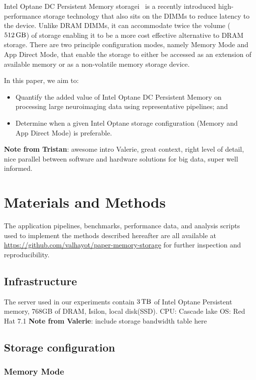 \documentclass[conference]{IEEEtran}
\newcommand{\valerie}[1]{\color{blue}\textbf{Note from Valerie}:
      #1 \color{black}}
\newcommand{\tristan}[1]{\color{orange}\textbf{Note from Tristan}:
      #1 \color{black}}
\begin{document}
Intel Optane DC Persistent Memory storagei~\cite{optanebrief} is a recently introduced high-performance
storage technology that also sits on the DIMMs to reduce latency to the device.
Unlike DRAM DIMMs, it can accommodate twice the volume ($\SI{512}{\giga\byte}$) of
storage enabling it to be a more cost effective alternative to DRAM storage.
There are two principle configuration modes, namely Memory Mode and App Direct Mode,
that enable the storage to either be accessed as an extension of available memory 
or as a non-volatile memory storage device.


In this paper, we aim to:
\begin{itemize}
        \item Quantify the added value of Intel Optane DC Persistent Memory on 
            processing large neuroimaging data using representative pipelines; and
        \item Determine when a given Intel Optane storage configuration (Memory 
            and App Direct Mode) is preferable.
\end{itemize}

\tristan{awesome intro Valerie, great context, right level of detail, nice 
parallel between software and hardware solutions for big data, super well informed.}

\section{Materials and Methods}
The application pipelines, benchmarks, performance data, and analysis scripts used 
to implement the methods described hereafter are all available at 
\url{https://github.com/valhayot/paper-memory-storage} for 
further inspection and reproducibility.

\subsection{Infrastructure}

The server used in our experiments contain $\SI{3}{\tera\byte}$ of Intel Optane Persistent memory, 768GB of DRAM,
Isilon, local disk(SSD).
CPU: Cascade lake
OS: Red Hat 7.1
\valerie{include storage bandwidth table here}

\subsection{Storage configuration}

\subsubsection{Memory Mode}
\end{document}
